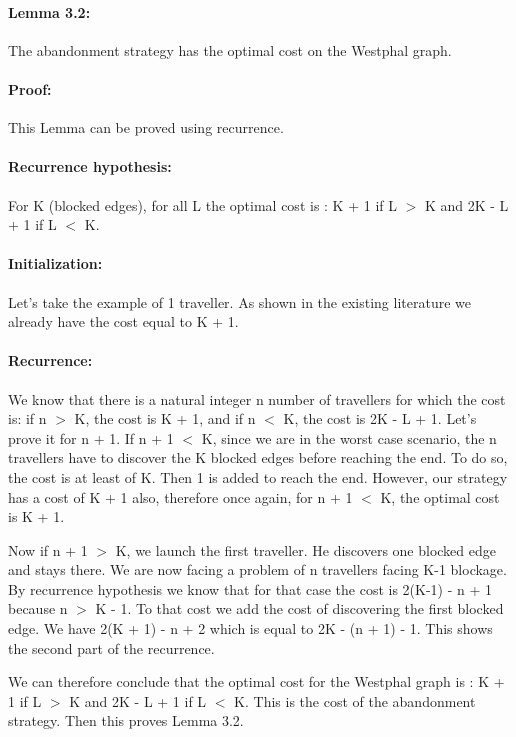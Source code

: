 \documentclass[a4paper, 10pt]{article}
\begin{document}
\paragraph{Lemma 3.2:} The abandonment strategy has the optimal cost on the Westphal graph.

\paragraph{Proof:} This Lemma can be proved using recurrence.  

\paragraph{Recurrence hypothesis:} For K (blocked edges), for all L the optimal cost is : K + 1 if L $>$ K and 2K - L + 1 if L $<$ K.

\paragraph{Initialization:} Let's take the example of 1 traveller. As shown in the existing literature we already have the cost equal to K + 1.

\paragraph{Recurrence:} We know that there is a natural integer n number of travellers for which the cost is: if n $>$ K, the cost is K + 1, and if n $<$ K, the cost is 2K - L + 1. Let's prove it for n + 1. 
If n + 1 $<$ K, since we are in the worst case scenario, the n travellers have to discover the K blocked edges before reaching the end. To do so, the cost is at least of K. Then 1 is added to reach the end. However, our strategy has a cost of K + 1 also, therefore once again, for n + 1 $<$ K, the optimal cost is K + 1. 

Now if n + 1 $>$ K, we launch the first traveller. He discovers one blocked edge and stays there. We are now facing a problem of n travellers facing K-1 blockage. By recurrence hypothesis we know that for that case the cost is 2(K-1) - n + 1 because n $>$ K - 1. To that cost we add the cost of discovering the first blocked edge. We have 2(K + 1) - n + 2 which is equal to 2K - (n + 1) - 1. This shows the second part of the recurrence.

We can therefore conclude that the optimal cost for the Westphal graph is : K + 1 if L $>$ K and 2K - L + 1 if L $<$ K. This is the cost of the abandonment strategy. Then this proves Lemma 3.2.
\end{document}
